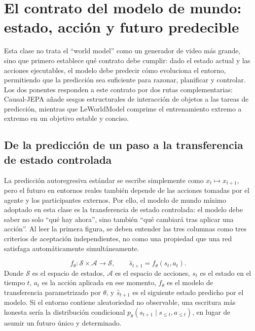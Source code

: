 \section{El contrato del modelo de mundo: estado, acción y futuro predecible}

Esta clase no trata el ``world model'' como un generador de video más grande, sino que primero establece qué contrato debe cumplir: dado el estado actual y las acciones ejecutables, el modelo debe predecir cómo evoluciona el entorno, permitiendo que la predicción sea suficiente para razonar, planificar y controlar. Los dos ponentes responden a este contrato por dos rutas complementarias: Causal-JEPA añade sesgos estructurales de interacción de objetos a las tareas de predicción, mientras que LeWorldModel comprime el entrenamiento extremo a extremo en un objetivo estable y conciso.

\subsection{De la predicción de un paso a la transferencia de estado controlada}

La predicción autoregresiva estándar se escribe simplemente como $x_t\mapsto x_{t+1}$, pero el futuro en entornos reales también depende de las acciones tomadas por el agente y los participantes externos. Por ello, el modelo de mundo mínimo adoptado en esta clase es la transferencia de estado controlada: el modelo debe saber no solo ``qué hay ahora'', sino también ``qué cambiará tras aplicar una acción''. Al leer la primera figura, se deben entender las tres columnas como tres criterios de aceptación independientes, no como una propiedad que una red satisfaga automáticamente simultáneamente.


\[
f_\theta:\mathcal{S}\times\mathcal{A}\rightarrow\mathcal{S},
\qquad
\hat{s}_{t+1}=f_\theta(s_t,a_t).
\]
Donde $\mathcal{S}$ es el espacio de estados, $\mathcal{A}$ es el espacio de acciones, $s_t$ es el estado en el tiempo $t$, $a_t$ es la acción aplicada en ese momento, $f_\theta$ es el modelo de transferencia parametrizado por $\theta$, y $\hat{s}_{t+1}$ es el siguiente estado predicho por el modelo. Si el entorno contiene aleatoriedad no observable, una escritura más honesta sería la distribución condicional $p_\theta(s_{t+1}\mid s_{\le t},a_{\le t})$, en lugar de asumir un futuro único y determinado.

